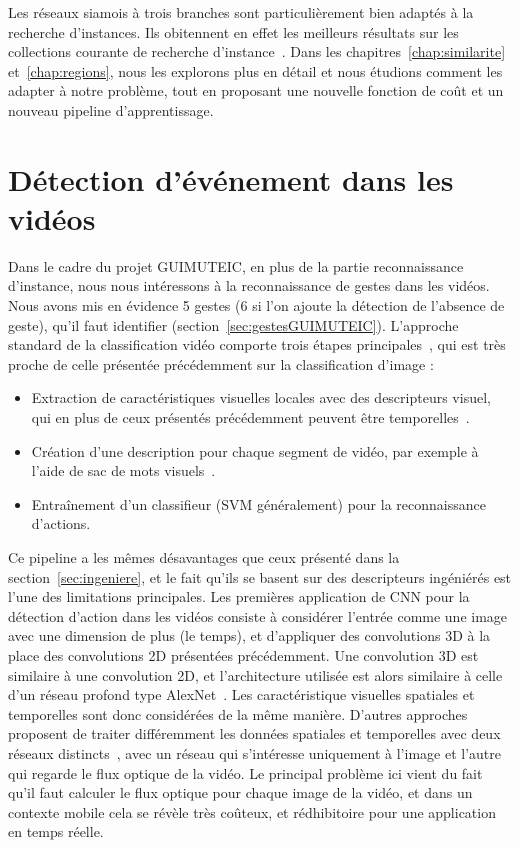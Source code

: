 Les réseaux siamois à trois branches sont particulièrement bien adaptés à la recherche d'instances.
Ils obitennent en effet les meilleurs résultats sur les collections courante de recherche d'instance~\cite{gordo2016deep}.
Dans les chapitres~\ref{chap:similarite} et~\ref{chap:regions}, nous les explorons plus en détail et nous étudions comment les adapter à notre problème, tout en proposant une nouvelle fonction de coût et un nouveau pipeline d'apprentissage.


\section{Détection d'événement dans les vidéos}
\label{sec:stateVideo}

Dans le cadre du projet GUIMUTEIC, en plus de la partie reconnaissance d'instance, nous nous intéressons à la reconnaissance de gestes dans les vidéos.
Nous avons mis en évidence 5 gestes (6 si l'on ajoute la détection de l'absence de geste), qu'il faut identifier (section~\ref{sec:gestesGUIMUTEIC}).
L'approche standard de la classification vidéo comporte trois étapes principales~\cite{sivic2003video, liu2009recognizing, wang2009evaluation}, qui est très proche de celle présentée précédemment sur la classification d'image :

\begin{itemize}
	\item Extraction de caractéristiques visuelles locales avec des descripteurs visuel, qui en plus de ceux présentés précédemment peuvent être temporelles~\cite{dollar2005behavior,wang2011action}.
  \item Création d'une description pour chaque segment de vidéo, par exemple à l'aide de sac de mots visuels~\cite{laptev2008learning}.
	\item Entraînement d'un classifieur (SVM généralement) pour la reconnaissance d'actions.
\end{itemize}

Ce pipeline a les mêmes désavantages que ceux présenté dans la section~\ref{sec:ingeniere}, et le fait qu'ils se basent sur des descripteurs ingéniérés est l’une des limitations principales.
Les premières application de CNN pour la détection d'action dans les vidéos consiste à considérer l'entrée comme une image avec une dimension de plus (le temps), et d'appliquer des convolutions 3D à la place des convolutions 2D présentées précédemment.
Une convolution 3D est similaire à une convolution 2D, et l'architecture utilisée est alors similaire à celle d'un réseau profond type AlexNet~\cite{baccouche2011sequential}.
Les caractéristique visuelles spatiales et temporelles sont donc considérées de la même manière.
D'autres approches proposent de traiter différemment les données spatiales et temporelles avec deux réseaux distincts~\cite{simonyan2014two}, avec un réseau qui s'intéresse uniquement à l'image et l'autre qui regarde le flux optique de la vidéo.
Le principal problème ici vient du fait qu'il faut calculer le flux optique pour chaque image de la vidéo, et dans un contexte mobile cela se révèle très coûteux, et rédhibitoire pour une application en temps réelle.

